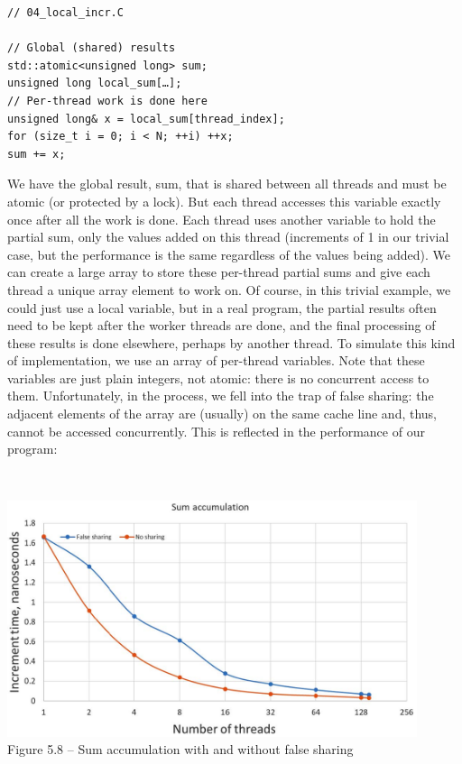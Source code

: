 \begin{lstlisting}[style=styleCXX]
// 04_local_incr.C

// Global (shared) results
std::atomic<unsigned long> sum;
unsigned long local_sum[…];
// Per-thread work is done here
unsigned long& x = local_sum[thread_index];
for (size_t i = 0; i < N; ++i) ++x;
sum += x;
\end{lstlisting}

We have the global result, sum, that is shared between all threads and must be atomic (or protected by a lock). But each thread accesses this variable exactly once after all the work is done. Each thread uses another variable to hold the partial sum, only the values added on this thread (increments of 1 in our trivial case, but the performance is the same regardless of the values being added). We can create a large array to store these per-thread partial sums and give each thread a unique array element to work on. Of course, in this trivial example, we could just use a local variable, but in a real program, the partial results often need to be kept after the worker threads are done, and the final processing of these results is done elsewhere, perhaps by another thread. To simulate this kind of implementation, we use an array of per-thread variables. Note that these variables are just plain integers, not atomic: there is no concurrent access to them. Unfortunately, in the process, we fell into the trap of false sharing: the adjacent elements of the array are (usually) on the same cache line and, thus, cannot be accessed concurrently. This is reflected in the performance of our program:

\hspace*{\fill} \\ %
\begin{center}
\includegraphics[width=0.9\textwidth]{content/1/chapter5/images/8.jpg}\\
Figure 5.8 – Sum accumulation with and without false sharing
\end{center}


